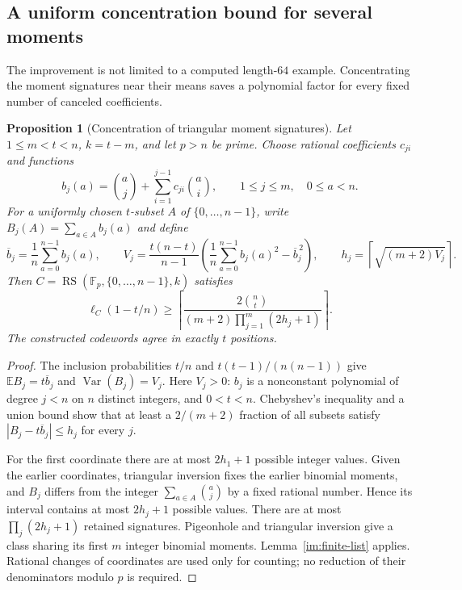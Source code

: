 \documentclass[11pt,letterpaper]{article}
\newtheorem{proposition}[theorem]{Proposition}
\theoremstyle{definition}
\theoremstyle{remark}
\newcommand{\F}{\mathbb F}
\newcommand{\RS}{\operatorname{RS}}
\begin{document}
\subsection{A uniform concentration bound for several moments}
\label{sec:moment-concentration}

The improvement is not limited to a computed length-$64$ example.
Concentrating the moment signatures near their means saves a polynomial
factor for every fixed number of canceled coefficients.

\begin{proposition}[Concentration of triangular moment signatures]
\label{prop:moment-concentration}
Let $1\le m<t<n$, $k=t-m$, and let $p>n$ be prime.
Choose rational coefficients $c_{ji}$ and functions
\[
 b_j(a)=\binom aj+\sum_{i=1}^{j-1}c_{ji}\binom ai,
 \qquad 1\le j\le m,\quad 0\le a<n.
\]
For a uniformly chosen $t$-subset $A$ of $\{0,\ldots,n-1\}$,
write $B_j(A)=\sum_{a\in A}b_j(a)$ and define
\[
 \overline b_j=\frac1n\sum_{a=0}^{n-1}b_j(a),\qquad
 V_j=\frac{t(n-t)}{n-1}
       \left(\frac1n\sum_{a=0}^{n-1}b_j(a)^2-\overline b_j^{\,2}\right),
 \qquad h_j=\left\lceil\sqrt{(m+2)V_j}\right\rceil.
\]
Then $C=\RS(\F_p,\{0,\ldots,n-1\},k)$ satisfies
\begin{equation}\label{eq:moment-concentration}
 \ell_C(1-t/n)\ge
 \left\lceil\frac{2\binom nt}
 {(m+2)\prod_{j=1}^m(2h_j+1)}\right\rceil.
\end{equation}
The constructed codewords agree in exactly $t$ positions.
\end{proposition}
\begin{proof}
The inclusion probabilities $t/n$ and $t(t-1)/(n(n-1))$ give
$\mathbb E B_j=t\overline b_j$ and $\operatorname{Var}(B_j)=V_j$.
Here $V_j>0$: $b_j$ is a nonconstant polynomial of degree $j<n$
on $n$ distinct integers, and $0<t<n$.
Chebyshev's inequality and a union bound show that at least a
$2/(m+2)$ fraction of all subsets satisfy
$|B_j-t\overline b_j|\le h_j$ for every $j$.

For the first coordinate there are at most $2h_1+1$ possible integer
values. Given the earlier coordinates, triangular inversion fixes the
earlier binomial moments, and $B_j$ differs from the integer
$\sum_{a\in A}\binom aj$ by a fixed rational number. Hence its
interval contains at most $2h_j+1$ possible values. There are at most
$\prod_j(2h_j+1)$ retained signatures. Pigeonhole and triangular
inversion give a class sharing its first $m$ integer binomial moments.
Lemma~\ref{im:finite-list} applies. Rational changes of coordinates
are used only for counting; no reduction of their denominators modulo
$p$ is required.
\end{proof}
\end{document}
